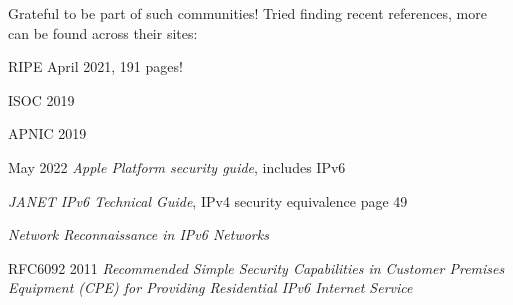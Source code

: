 \documentclass[Screen16to9,17pt]{foils}
\begin{document}

Grateful to be part of such communities! Tried finding recent references, more can be found across their sites:
\begin{list2}
\item RIPE April 2021, 191 pages!\\

\item ISOC 2019

\item APNIC 2019


\item May 2022 \emph{Apple Platform security guide}, includes IPv6\\

\item \emph{JANET IPv6 Technical Guide}, IPv4 security equivalence page 49\\

\item \emph{Network Reconnaissance in IPv6 Networks} 

\item RFC6092 2011 \emph{Recommended Simple Security Capabilities in Customer Premises Equipment (CPE) for Providing Residential IPv6 Internet Service}\\
\end{list2}
\end{document}

